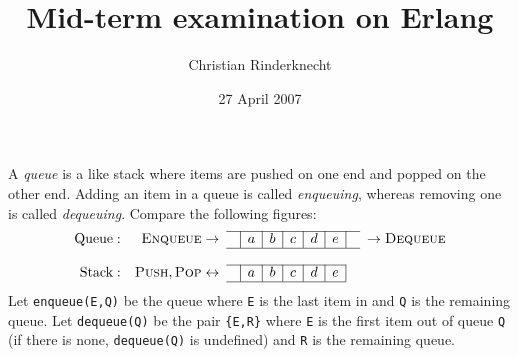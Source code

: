 \documentclass[11pt, a4paper]{article}
\title{Mid-term examination on Erlang}
\author{Christian Rinderknecht}
\date{27 April 2007}
\begin{document}
\maketitle

\thispagestyle{empty}

\noindent A \emph{queue} is a like stack where items are pushed on one
end and popped on the other end. Adding an item in a queue is called
\emph{enqueuing}, whereas removing one is called
\emph{dequeuing}. Compare the following figures:
\[
\begin{array}{rr@{\;}cc|c|c|c|c|c|cc@{\;}l}
\cline{4-10}
\text{Queue}: & \textsc{Enqueue} & \rightarrow & & a & b & c & d & e &
& \rightarrow & \textsc{Dequeue}\\
\cline{4-10}\\
\cline{4-9}
\text{Stack}: & \textsc{Push}, \textsc{Pop} & \leftrightarrow & & a &
b & c & d & e &&&\\
\cline{4-9}
\end{array}
\]
\noindent Let \texttt{enqueue(E,Q)} be the queue where \texttt{E} is
the last item in and \texttt{Q} is the remaining queue. Let
\texttt{dequeue(Q)} be the pair \texttt{\{E,R\}} where \texttt{E} is
the first item out of queue \texttt{Q} (if there is none,
\texttt{dequeue(Q)} is undefined) and \texttt{R} is the remaining
queue.

\bigskip



\end{document}
